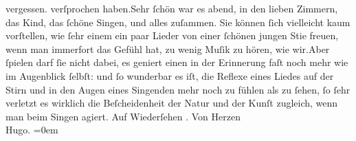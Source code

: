 \begin{ledgroupsized}[t]{13cm}
{{{                        vergessen.}}}\label{T_L01319_1h} verſprochen haben.\hspace*{1.5em}Sehr
                    ſchön war es \label{K_L01319_1v}\label{K_L01319_1h} abend, in den lieben
                    Zimmern, das Kind, das
                    ſchöne Singen, und alles zuſammen. Sie können ſich vielleicht kaum vorſtellen,
                    wie ſehr einem ein paar Lieder von einer ſchönen jungen Sti{\geminationm}e freuen, wenn {\pb}man immerfort das Gefühl
                    hat, zu wenig Muſik zu hören, wie wir.\hspace*{1.5em}Aber
                    ſpielen darf ſie nicht dabei, es geniert einen in der Erinnerung faſt noch mehr
                    wie im Augenblick ſelbſt: und ſo wunderbar es iſt, die Reflexe eines Liedes auf
                    der Stirn und in den Augen eines Singenden mehr noch zu fühlen als zu ſehen, ſo
                    ſehr {\pb}verletzt es wirklich
                    die Beſcheidenheit der Natur und der Kunſt zugleich, wenn man beim Singen
                    agiert.\pend
           \pstart
           Auf Wiederſehen \label{K_L01319_2v}\label{K_L01319_2h}.\pend
           \pstart
           Von Herzen{\\[\baselineskip]}\spacefill\mbox{Hugo.}\pend
           \leftskip=0em{}
         
         \endnumbering{}\end{ledgroupsized}  \newcommand{\dateiname}{L01319}\newcommand{\titel}{Hugo von Hofmannsthal an Arthur Schnitzler, 27. 9. [1903]}\newcommand{\editorInnen}{ Martin Anton Müller und Gerd-Hermann Susen}
      